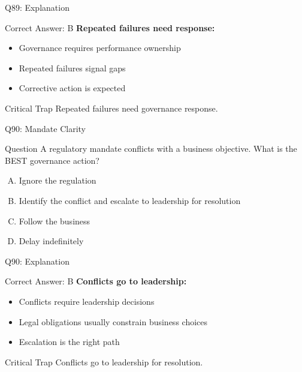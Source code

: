 \documentclass{beamer}
\begin{document}
	\begin{frame}{Q89: Explanation}
		\begin{block}{Correct Answer: B}
			\textbf{Repeated failures need response:}
			\begin{itemize}
				\item Governance requires performance ownership
				\item Repeated failures signal gaps
				\item Corrective action is expected
			\end{itemize}
		\end{block}
		\begin{alertblock}{Critical Trap}
			Repeated failures need governance response.
		\end{alertblock}
	\end{frame}
	
	\begin{frame}{Q90: Mandate Clarity}
		\begin{block}{Question}
			A regulatory mandate conflicts with a business objective. What is the BEST governance action?
		\end{block}
		\begin{enumerate}[(A)]
			\item Ignore the regulation
			\item Identify the conflict and escalate to leadership for resolution
			\item Follow the business
			\item Delay indefinitely
		\end{enumerate}
	\end{frame}
	
	\begin{frame}{Q90: Explanation}
		\begin{block}{Correct Answer: B}
			\textbf{Conflicts go to leadership:}
			\begin{itemize}
				\item Conflicts require leadership decisions
				\item Legal obligations usually constrain business choices
				\item Escalation is the right path
			\end{itemize}
		\end{block}
		\begin{alertblock}{Critical Trap}
			Conflicts go to leadership for resolution.
		\end{alertblock}
	\end{frame}
	
\end{document}
